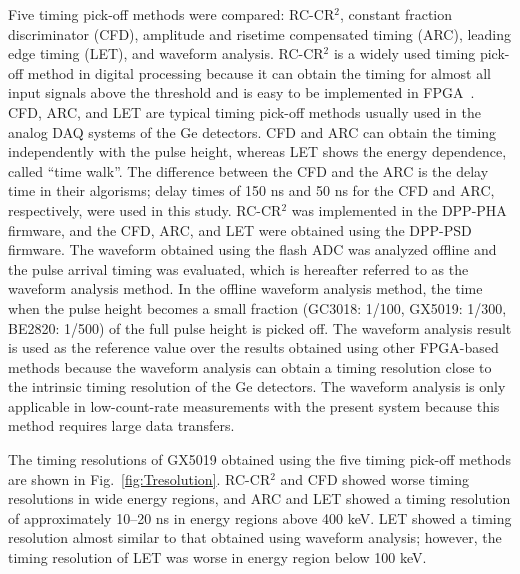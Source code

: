 Five timing pick-off methods were compared: RC-CR$^2$, constant fraction discriminator (CFD), amplitude and risetime compensated timing (ARC), leading edge timing (LET), and waveform analysis.
RC-CR$^2$ is a widely used timing pick-off method in digital processing because
it can obtain the timing for almost all input signals above the threshold and is easy to be implemented in FPGA~\cite{Guzik2013-zv}.
CFD, ARC, and LET are typical timing pick-off methods usually used in the analog DAQ systems of the Ge detectors.
CFD and ARC can obtain the timing independently with the pulse height, whereas LET shows the energy dependence, called ``time walk''. 
The difference between the CFD and the ARC is the delay time in their algorisms; delay times of 150 ns and 50 ns for the CFD and ARC, respectively, were used in this study. 
RC-CR$^2$ was implemented in the DPP-PHA firmware, and the CFD, ARC, and LET were obtained using the DPP-PSD firmware. 
The waveform obtained using the flash ADC was analyzed offline and the pulse arrival timing was evaluated, which is hereafter referred to as the waveform analysis method.
In the offline waveform analysis method, 
the time when the pulse height becomes a small fraction (GC3018: 1/100, GX5019: 1/300, BE2820: 1/500) of the full pulse height is picked off.
The waveform analysis result is used as the reference value over the results obtained using other FPGA-based methods because the waveform analysis can obtain a timing resolution close to the intrinsic timing resolution of the Ge detectors. 
The waveform analysis is only applicable in low-count-rate measurements with the present system because this method requires large data transfers.

The timing resolutions of GX5019 obtained using the five timing pick-off methods are shown in Fig.~\ref{fig:Tresolution}.
RC-CR$^2$ and CFD showed worse timing resolutions in wide energy regions, and ARC and LET showed a timing resolution of approximately 10--20 ns in energy regions above 400 keV.
LET showed a timing resolution almost similar to that obtained using waveform analysis; however, the timing resolution of LET was worse in energy region below 100 keV.

